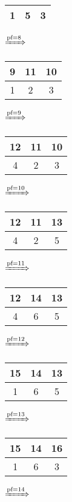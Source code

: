 \documentclass{article}
\begin{document}
\begin{itemize}
\begin{tabular}{|c|c|c|}
                \hline
                1 & 5 & 3\\
                \hline
            \end{tabular}
            $\xRightarrow{\text{pf}=8}$
            \begin{tabular}{|c|c|c|}
                \hline
                9 & 11 & 10\\
                \hline
                1 & 2 & 3\\
                \hline
            \end{tabular}
            $\xRightarrow{\text{pf}=9}$
            \begin{tabular}{|c|c|c|}
                \hline
                12 & 11 & 10\\
                \hline
                4 & 2 & 3\\
                \hline
            \end{tabular}
            $\xRightarrow{\text{pf}=10}$
            \begin{tabular}{|c|c|c|}
                \hline
                12 & 11 & 13\\
                \hline
                4 & 2 & 5\\
                \hline
            \end{tabular}
            $\xRightarrow{\text{pf}=11}$
            \begin{tabular}{|c|c|c|}
                \hline
                12 & 14 & 13\\
                \hline
                4 & 6 & 5\\
                \hline
            \end{tabular}
            $\xRightarrow{\text{pf}=12}$
            \begin{tabular}{|c|c|c|}
                \hline
                15 & 14 & 13\\
                \hline
                1 & 6 & 5\\
                \hline
            \end{tabular}
            $\xRightarrow{\text{pf}=13}$
            \begin{tabular}{|c|c|c|}
                \hline
                15 & 14 & 16\\
                \hline
                1 & 6 & 3\\
                \hline
            \end{tabular}
            $\xRightarrow{\text{pf}=14}$
            \begin{tabular}{|c|c|c|}

\end{tabular}
\end{itemize}
\end{document}
